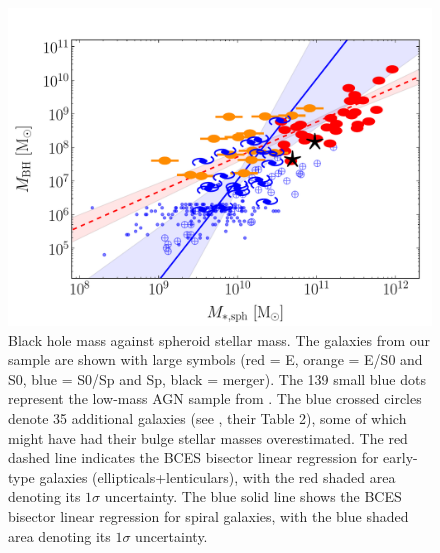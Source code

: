 \documentclass[preprint2]{emulateapj}
\begin{document}
\begin{figure}[h]
\begin{center}
\includegraphics[width=\columnwidth]{images/mbh_vs_mass_sph_galsymb_agn.pdf}
\caption{Black hole mass against spheroid stellar mass. 
The galaxies from our sample are shown with large symbols (red = E, orange = E/S0 and S0, blue = S0/Sp and Sp, black = merger).
The 139 small blue dots represent the low-mass AGN sample from \cite{jiang2011a}. 
The blue crossed circles denote 35 additional galaxies (see \citealt{grahamscott2015}, their Table 2), 
some of which might have had their bulge stellar masses overestimated.
The red dashed line indicates the BCES bisector linear regression for early-type galaxies (ellipticals+lenticulars), 
with the red shaded area denoting its $1\sigma$ uncertainty. 
The blue solid line shows the BCES bisector linear regression for spiral galaxies, 
with the blue shaded area denoting its $1\sigma$ uncertainty. }
\label{fig:mbhmasssph}
\end{center}
\end{figure}
\end{document}
